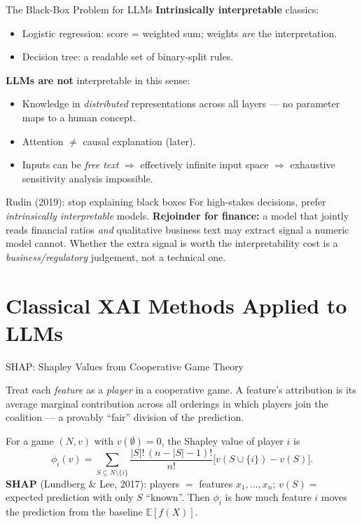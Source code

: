 \documentclass[9pt,t]{beamer}
\begin{document}
\begin{frame}{The Black-Box Problem for LLMs}
\textbf{Intrinsically interpretable} classics:
\begin{itemize}
  \item Logistic regression: score = weighted sum; weights \emph{are} the interpretation.
  \item Decision tree: a readable set of binary-split rules.
\end{itemize}

\medskip
\textbf{LLMs are not} interpretable in this sense:
\begin{itemize}
  \item Knowledge in \emph{distributed} representations across all layers --- no
        parameter maps to a human concept.
  \item Attention $\ne$ causal explanation (later).
  \item Inputs can be \emph{free text} $\Rightarrow$ effectively infinite input
        space $\Rightarrow$ exhaustive sensitivity analysis impossible.
\end{itemize}

\medskip
\begin{alertblock}{Rudin (2019): stop explaining black boxes}
For high-stakes decisions, prefer \emph{intrinsically interpretable} models.
\textbf{Rejoinder for finance:} a model that jointly reads financial ratios
\emph{and} qualitative business text may extract signal a numeric model cannot.
Whether the extra signal is worth the interpretability cost is a
\emph{business/regulatory} judgement, not a technical one.
\end{alertblock}
\end{frame}

\section{Classical XAI Methods Applied to LLMs}

\begin{frame}{SHAP: Shapley Values from Cooperative Game Theory}
\begin{bigpicture}
Treat each \emph{feature} as a \emph{player} in a cooperative game. A feature's
attribution is its average marginal contribution across all orderings in which
players join the coalition --- a provably ``fair'' division of the prediction.
\end{bigpicture}

\begin{underhood}
For a game $(N,v)$ with $v(\emptyset)=0$, the Shapley value of player $i$ is
\[
\phi_i(v) = \sum_{S \subseteq N \setminus \{i\}}
\frac{|S|!\,(n-|S|-1)!}{n!}\bigl[v(S \cup \{i\}) - v(S)\bigr].
\]
\textbf{SHAP} (Lundberg \& Lee, 2017): players $=$ features $x_1,\dots,x_n$;
$v(S)=$ expected prediction with only $S$ ``known''. Then $\phi_i$ is how much
feature $i$ moves the prediction from the baseline $\mathbb{E}[f(X)]$.
\end{underhood}
\end{frame}
\end{document}
